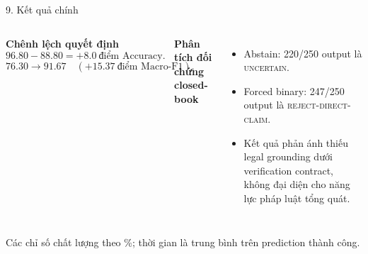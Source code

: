 \documentclass[aspectratio=169,10pt]{beamer}
\begin{document}
\begin{frame}{9. Kết quả chính}
\centering
{}

\vspace{5mm}
\begin{columns}[T,onlytextwidth]
\textbf{Chênh lệch quyết định}
\begin{equation*}
96.80-88.80=\mathbf{+8.0}\ \text{điểm Accuracy}.
\end{equation*}
\begin{equation*}
76.30\rightarrow91.67
\quad(+15.37\ \text{điểm Macro-F1}).
\end{equation*}

\textbf{Phân tích đối chứng closed-book}
\begin{itemize}\small
  \item Abstain: 220/250 output là \textsc{uncertain}.
  \item Forced binary: 247/250 output là \textsc{reject-direct-claim}.
  \item Kết quả phản ánh thiếu legal grounding dưới verification contract, không đại diện cho năng lực pháp luật tổng quát.
\end{itemize}
\end{columns}

\vfill
{\tiny Các chỉ số chất lượng theo \%; thời gian là trung bình trên prediction thành công.}
\end{frame}
\end{document}
